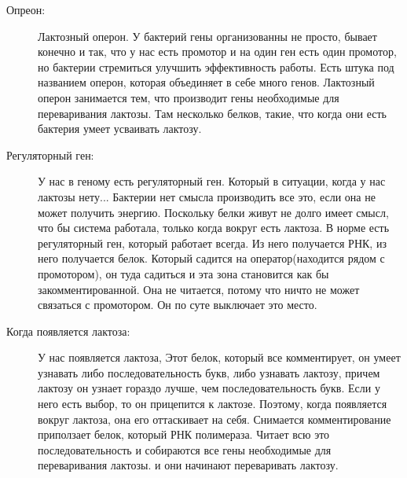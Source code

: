 \begin{description}
\item[Опреон:]
Лактозный оперон. У бактерий гены организованны не просто, 
бывает конечно и так, что у нас есть промотор и на один ген есть
один промотор, но бактерии стремиться улучшить эффективность работы.
Есть штука под названием оперон, которая объединяет в себе много
генов. Лактозный оперон занимается тем, что производит гены необходимые
для переваривания лактозы. Там несколько белков,
такие, что когда они есть бактерия
умеет усваивать лактозу.

\item[Регуляторный ген:]
У нас в геному есть регуляторный ген. Который в ситуации, когда у нас
лактозы нету... Бактерии нет смысла производить все это, если
она не может получить энергию. Поскольку белки живут не долго
имеет смысл, что бы система работала, только
когда вокруг есть лактоза. В норме есть регуляторный ген,
который работает всегда. Из него получается
РНК, из него получается белок. Который садится на оператор(находится рядом с промотором),
он туда садиться и эта зона становится как бы закомментированной. Она
не читается, потому что ничто не может связаться с промотором. Он
по суте выключает это место.

\item[Когда появляется лактоза:]
У нас появляется лактоза, Этот белок, который все комментирует,
он умеет узнавать либо последовательность букв, либо узнавать лактозу,
причем лактозу он узнает гораздо лучше, чем последовательность букв.
Если у него есть выбор, то он прицепится к лактозе. Поэтому, когда
появляется вокруг лактоза, она его оттаскивает на себя. Снимается комментирование
приползает белок, который РНК полимераза. Читает всю это последовательность и
собираются все гены необходимые для переваривания лактозы. и они начинают переваривать лактозу.  
\end{description}